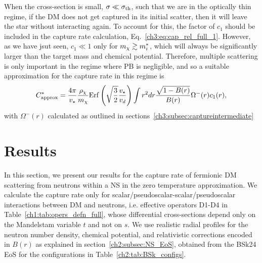 When the cross-section is small, $\sigma\ll\sigma_{\rm th}$, such that we are in the optically thin regime, if the DM does not get captured in its initial scatter, then it will leave the star without interacting again. To account for this, the factor of $c_1$ should be included in the capture rate calculation, Eq.~\ref{ch3:eq:cap_rel_full_1}. However, as we have jsut seen, $c_1\ll1$ only for $m_\chi\gtrsim m_i^*$, which will always be significantly larger than the target mass and chemical potential. Therefore, multiple scattering is only important in the regime where PB is negligible, and so a suitable approximation for the capture rate in this regime is
\begin{equation}
    C_\mathrm{approx}^* = \frac{4\pi}{v_\star}\frac{\rho_\chi}{m_\chi}{\rm Erf}\left(\sqrt{\frac{3}{2}}\frac{v_\star}{v_d}\right)  \int  r^2 dr  \frac{\sqrt{1-B(r)}}{B(r)}\Omega^{-}(r) c_1(r),
    \label{ch3:eq:capturesimplelargem}
\end{equation}
with $\Omega^-(r)$ calculated as outlined in sections~\ref{ch3:subsec:captureintermediate}
    
\section{Results}
\label{ch3:sec:results}


In this section, we present our results for the capture rate of fermionic DM scattering from neutrons within a NS in the zero temperature approximation. We calculate the capture rate only for scalar/pseudoscalar-scalar/pseudoscalar interactions between DM and neutrons, i.e. effective operators D1-D4 in Table~\ref{ch1:tab:opers_defn_full}, whose differential cross-sections depend only on the Mandelstam variable $t$ and not on $s$. 
We use realistic radial profiles for the neutron number density, chemical potential, and relativistic corrections encoded in $B(r)$ as explained in section~\ref{ch2:subsec:NS_EoS}, obtained from the BSk24 EoS for the configurations in Table~\ref{ch2:tab:BSk_configs}. 



